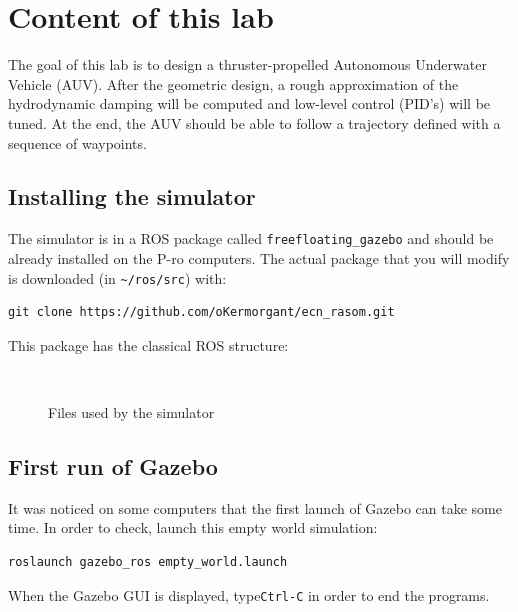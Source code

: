 \documentclass{ecnreport}
\begin{document}


\section{Content of this lab}

The goal of this lab is to design a thruster-propelled Autonomous Underwater Vehicle (AUV). After the geometric design, a rough approximation of the hydrodynamic damping will be computed
and low-level control (PID's) will be tuned. At the end, the AUV should be able to follow a trajectory defined with a sequence of waypoints.

\subsection{Installing the simulator}

The simulator is in a ROS package called \texttt{freefloating\_gazebo} and should be already installed on the P-ro computers.
The actual package that you will modify is downloaded (in \texttt{\~{}/ros/src}) with:
\begin{center}
\begin{lstlisting}
git clone https://github.com/oKermorgant/ecn_rasom.git
\end{lstlisting}
\end{center}
This package has the classical ROS structure:
\begin{figure}[h]
\begin{minipage}{.25\linewidth} ~ \end{minipage}
\begin{minipage}{.5\linewidth}
\end{minipage}
\caption{Files used by the simulator}
\end{figure}

\subsection{First run of Gazebo}

It was noticed on some computers that the first launch of Gazebo can take some time. In order to check, launch this empty world simulation:
\begin{center}
\begin{lstlisting}
roslaunch gazebo_ros empty_world.launch
  \end{lstlisting}
  \end{center}
  When the Gazebo GUI is displayed, type\texttt{Ctrl-C} in order to end the programs.
\end{document}
